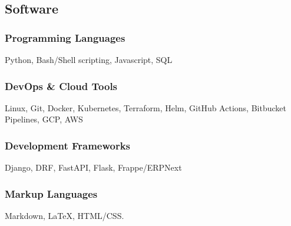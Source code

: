 \documentclass[a4paper]{article}
\begin{document}
        \subsection{Software}
			\subsubsection{Programming Languages}
			Python, Bash/Shell scripting, Javascript, SQL %
            \subsubsection{DevOps \& Cloud Tools}
            Linux, Git, Docker, Kubernetes, Terraform, Helm, GitHub Actions, Bitbucket Pipelines, GCP, AWS
            \subsubsection{Development Frameworks}
            Django, DRF, FastAPI, Flask, Frappe/ERPNext
			\subsubsection{Markup Languages}
			Markdown, {\LaTeX}, HTML/CSS.

\end{document}
